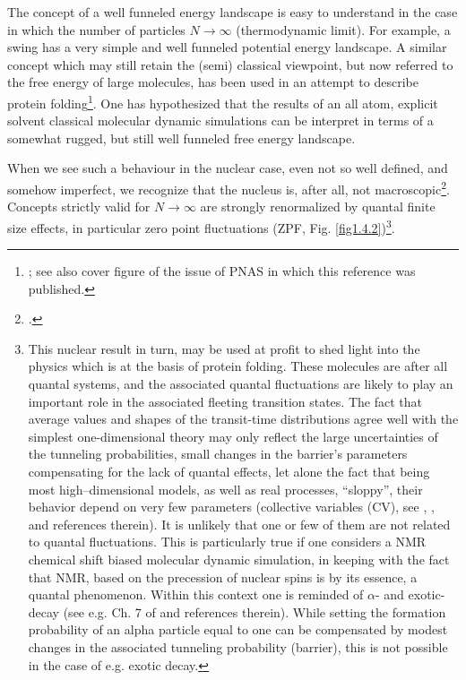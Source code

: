  
 
 The concept of a well funneled energy landscape  is easy to understand in the case in which the number of particles $N\rightarrow \infty$ (thermodynamic limit). For example, a swing has a very simple and well funneled potential energy landscape. A similar concept which may still retain the (semi) classical viewpoint, but now referred to the free energy of large molecules, has been used in an attempt to describe protein folding\footnote{\cite{Wolynes:16,Wolynes:12}; see also cover figure of the issue of PNAS in which this reference was published.}. One has hypothesized that the results of an all atom, explicit solvent classical molecular dynamic simulations can be interpret in terms of a somewhat rugged, but still well funneled free energy landscape.

When we see such a behaviour in the nuclear case, even not so well defined, and somehow imperfect, we recognize that the nucleus is, after all, not macroscopic\footnote{\cite{Anderson:72}.}. Concepts strictly valid for $N\rightarrow\infty$ are strongly renormalized by quantal finite size effects, in particular zero point fluctuations (ZPF, Fig. \ref{fig1.4.2})\footnote{This nuclear result in turn, may be used at profit to shed light into the physics which is at the basis of protein folding. These molecules are after all quantal systems, and the associated quantal fluctuations are likely to play an important role in the associated fleeting transition states. The fact that average values and shapes of the transit-time distributions agree well with the simplest one-dimensional theory may only reflect the large uncertainties of the tunneling probabilities, small changes in the barrier's parameters compensating for the lack of quantal effects, let alone the fact that being most high--dimensional models, as well as real processes, ``sloppy'', their behavior depend on very few parameters (collective variables (CV), see \cite{Buchanan:15}, \cite{Transtrum:15}, and references therein). It is unlikely that one or few of them are not  related to quantal fluctuations. This is particularly true if one considers a NMR chemical shift biased molecular dynamic simulation, in keeping with the fact that NMR, based  on the precession of nuclear spins is by its essence, a quantal phenomenon. Within this context one is reminded of $\alpha$- and exotic-decay (see e.g. Ch. 7 of \cite{Brink:05} and references therein). While setting the formation probability of an alpha particle equal to one  can be compensated by modest changes in the associated tunneling probability (barrier), this is not possible in the case of e.g. exotic decay.}.

